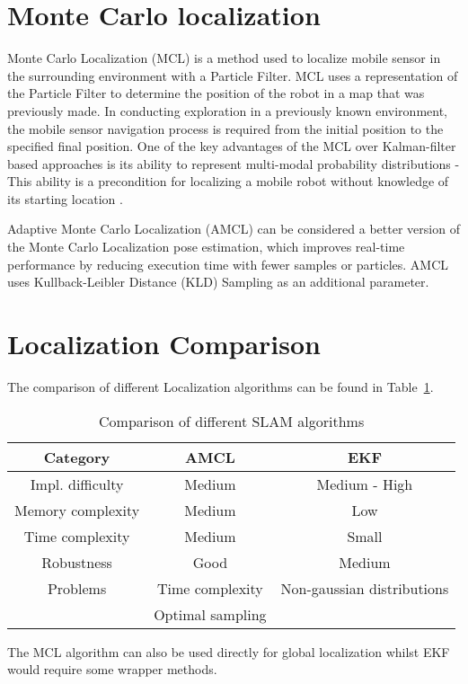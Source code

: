 \documentclass[12pt, a4paper, onecolumn]{article}
\begin{document}
\section{Monte Carlo localization}

Monte Carlo Localization (MCL) is a method used to localize mobile sensor in the surrounding environment with a Particle Filter\cite{Overview2021}. 
MCL uses a representation of the Particle Filter to determine the position of the robot in a map that was previously made.
In conducting exploration in a previously known environment, the mobile sensor navigation process is required from the initial position to the specified final position\cite{MCL99}. 
One of the key advantages of the MCL over Kalman-filter based approaches is its ability to represent multi-modal probability distributions - This ability is a precondition for localizing a mobile robot without knowledge of its starting location \cite{MCL99}.

Adaptive Monte Carlo Localization (AMCL) can be considered a better version of the Monte Carlo Localization pose estimation, which improves real-time performance by reducing execution time with fewer samples or particles. 
AMCL uses Kullback-Leibler Distance (KLD) Sampling as an additional parameter. \cite{AMCL19}

\section{Localization Comparison}
The comparison of different Localization algorithms can be found in Table~\ref{tab:slam_algorithms}.
\begin{table}[h!]
  \begin{center}
    \begin{tabular}[c]{|c || c c |}
      \hline
       Category        &  AMCL          & EKF                 \\
      \hline
      Impl. difficulty &  Medium        & Medium - High       \\
      \hline
      Memory complexity&  Medium        & Low                 \\
      \hline
      Time complexity  &  Medium        & Small               \\
      \hline
      Robustness       &  Good          & Medium              \\
      \hline
      Problems         & Time complexity & Non-gaussian distributions \\
                       & Optimal sampling &  \\
      \hline
    \end{tabular}
  \end{center}
  \caption{Comparison of different SLAM algorithms}
  \label{tab:slam_algorithms}
\end{table}
The MCL algorithm can also be used directly for global localization whilst EKF would require some wrapper methods.
\end{document}
